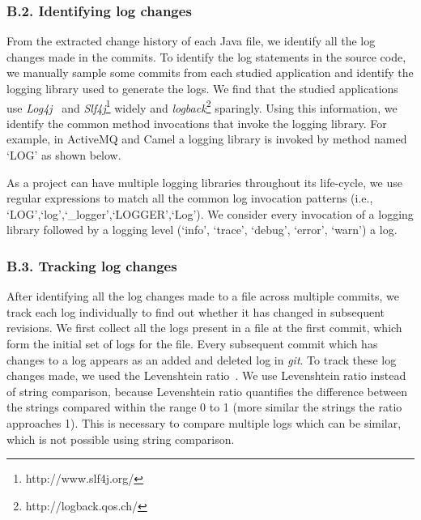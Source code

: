 \subsubsection*{B.2. Identifying log changes}
From the extracted change history of each {Java} file, we identify all the log changes made in the commits. To identify the log statements in the source code, we manually sample some commits from each studied application and identify the logging library used to generate the logs. We find that the studied applications use \textsl{Log4j}~\cite{EMSEIAN} and \textsl{Slf4j}\footnote{http://www.slf4j.org/} widely and \textsl{logback}\footnote{http://logback.qos.ch/} sparingly. Using this information, we identify the common method invocations that invoke the logging library. For example, in  ActiveMQ and Camel a logging library is invoked by method named `LOG' as shown below.


As a project can have multiple logging libraries throughout its life-cycle, we use regular expressions to match all the common log invocation patterns (i.e., `LOG',`log',`\_logger',`LOGGER',`Log'). We consider every invocation of a logging library followed by a logging level (`info', `trace', `debug', `error', `warn') a log.


\subsubsection*{B.3. Tracking log changes}
After identifying all the log changes made to a file across multiple commits, we track each log individually to find out whether it has changed in subsequent revisions. We first collect all the logs present in a file at the first commit, which form the initial set of logs for the file. Every subsequent commit which has changes to a log appears as an added and deleted log in \textsl{git}. To track these log changes made, we used the Levenshtein ratio~\cite{levenshteinratio}. We use Levenshtein ratio instead of string comparison, because Levenshtein ratio quantifies the difference between the strings compared within the range 0 to 1 (more similar the strings the ratio approaches 1). This is necessary to compare multiple logs which can be similar, which is not possible using string comparison.





